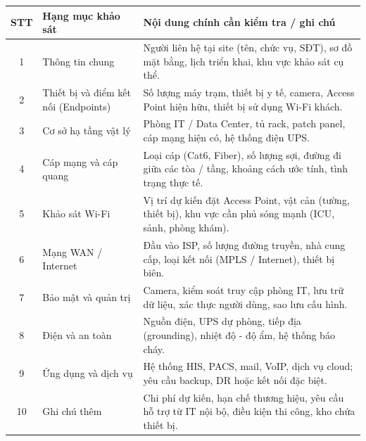 \begin{longtable}{|c|>{\raggedright\arraybackslash}p{4cm}|>{\raggedright\arraybackslash}p{9cm}|}
\hline
\textbf{STT} & \textbf{Hạng mục khảo sát} & \textbf{Nội dung chính cần kiểm tra / ghi chú} \\ \hline


1 & Thông tin chung & Người liên hệ tại site (tên, chức vụ, SĐT), sơ đồ mặt bằng, lịch triển khai, khu vực khảo sát cụ thể. \\ \hline
2 & Thiết bị và điểm kết nối (Endpoints) & Số lượng máy trạm, thiết bị y tế, camera, Access Point hiện hữu, thiết bị sử dụng Wi-Fi khách. \\ \hline
3 & Cơ sở hạ tầng vật lý & Phòng IT / Data Center, tủ rack, patch panel, cáp mạng hiện có, hệ thống điện UPS. \\ \hline
4 & Cáp mạng và cáp quang & Loại cáp (Cat6, Fiber), số lượng sợi, đường đi giữa các tòa / tầng, khoảng cách ước tính, tình trạng thực tế. \\ \hline
5 & Khảo sát Wi-Fi & Vị trí dự kiến đặt Access Point, vật cản (tường, thiết bị), khu vực cần phủ sóng mạnh (ICU, sảnh, phòng khám). \\ \hline
6 & Mạng WAN / Internet & Đầu vào ISP, số lượng đường truyền, nhà cung cấp, loại kết nối (MPLS / Internet), thiết bị biên. \\ \hline
7 & Bảo mật và quản trị & Camera, kiểm soát truy cập phòng IT, lưu trữ dữ liệu, xác thực người dùng, sao lưu cấu hình. \\ \hline
8 & Điện và an toàn & Nguồn điện, UPS dự phòng, tiếp địa (grounding), nhiệt độ - độ ẩm, hệ thống báo cháy. \\ \hline
9 & Ứng dụng và dịch vụ & Hệ thống HIS, PACS, mail, VoIP, dịch vụ cloud; yêu cầu backup, DR hoặc kết nối đặc biệt. \\ \hline
10 & Ghi chú thêm & Chi phí dự kiến, hạn chế thương hiệu, yêu cầu hỗ trợ từ IT nội bộ, điều kiện thi công, kho chứa thiết bị. \\ \hline
\end{longtable}

